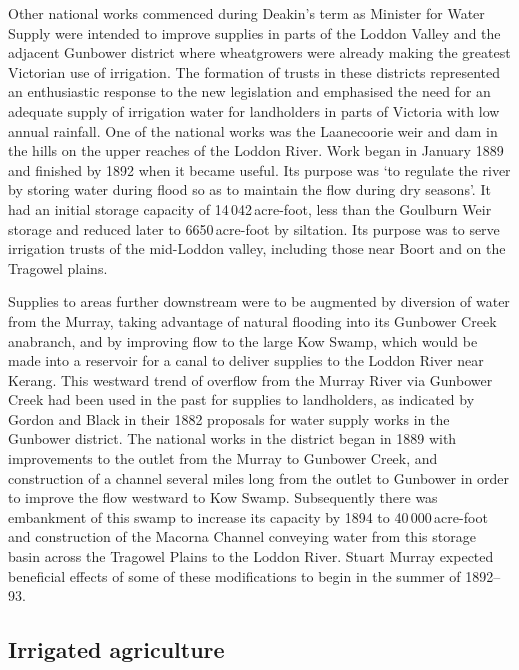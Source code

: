 Other national works commenced during Deakin's term as Minister for
Water Supply were intended to improve supplies in parts of the Loddon
Valley and the adjacent Gunbower district where wheatgrowers were
already making the greatest Victorian use of irrigation.  The
formation of trusts in these districts represented an enthusiastic
response to the new legislation and emphasised the need for an
adequate supply of irrigation water for landholders in parts of
Victoria with low annual rainfall.  One of the national works was the
Laanecoorie weir and dam in the hills on the upper reaches of the
Loddon River.  Work began in January 1889 and finished by 1892 when it
became useful.  Its purpose was `to regulate the river by storing
water during flood so as to maintain the flow during dry seasons'.  It
had an initial storage capacity of 14\,042\,acre-foot, less than the
Goulburn Weir storage and reduced later to 6650\,acre-foot by
siltation.  Its purpose was to serve irrigation trusts of the
mid-Loddon valley, including those near Boort and on the Tragowel
plains.

Supplies to areas further downstream were to be augmented by diversion
of water from the Murray, taking advantage of natural flooding into
its Gunbower Creek anabranch, and by improving flow to the large Kow
Swamp, which would be made into a reservoir for a canal to deliver
supplies to the Loddon River near Kerang.  This westward trend of
overflow from the Murray River via Gunbower Creek had been used in the
past for supplies to landholders, as indicated by Gordon and Black in
their 1882 proposals for water supply works in the Gunbower district.
The national works in the district began in 1889 with improvements to
the outlet from the Murray to Gunbower Creek, and construction of a
channel several miles long from the outlet to Gunbower in order to
improve the flow westward to Kow Swamp.  Subsequently there was
embankment of this swamp to increase its capacity by 1894 to
40\,000\,acre-foot and construction of the Macorna Channel conveying
water from this storage basin across the Tragowel Plains to the Loddon
River.  Stuart Murray expected beneficial effects of some of these
modifications to begin in the summer of
1892--93.

\subsection*{Irrigated agriculture}

